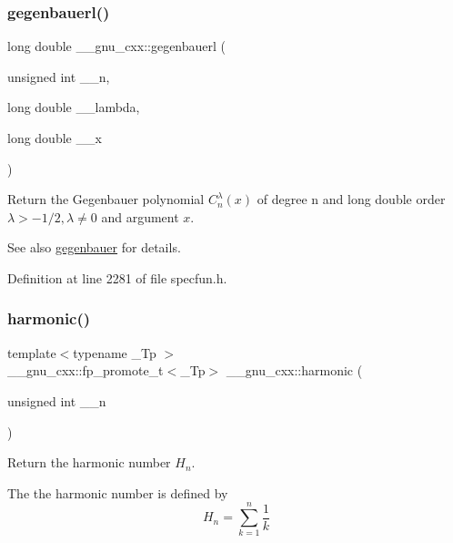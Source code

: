 \subsubsection{\texorpdfstring{gegenbauerl()}{gegenbauerl()}}
{\footnotesize\ttfamily long double \+\_\+\+\_\+gnu\+\_\+cxx\+::gegenbauerl (\begin{DoxyParamCaption}\item[{unsigned int}]{\+\_\+\+\_\+n,  }\item[{long double}]{\+\_\+\+\_\+lambda,  }\item[{long double}]{\+\_\+\+\_\+x }\end{DoxyParamCaption})\hspace{0.3cm}{\ttfamily [inline]}}

Return the Gegenbauer polynomial $ C_n^{\lambda}(x) $ of degree {\ttfamily n} and {\ttfamily long double} order $ \lambda > -1/2, \lambda \neq 0 $ and argument $ x $.

\begin{DoxySeeAlso}{See also}
\hyperlink{group__gnu__math__spec__func_ga512e7981e328d6184f604de1892048b6}{gegenbauer} for details. 
\end{DoxySeeAlso}


Definition at line 2281 of file specfun.\+h.

\mbox{\label{group__gnu__math__spec__func_gab052b72af9c7ec030bcea81965390614}} 
\subsubsection{\texorpdfstring{harmonic()}{harmonic()}}
{\footnotesize\ttfamily template$<$typename \+\_\+\+Tp $>$ \\
\+\_\+\+\_\+gnu\+\_\+cxx\+::fp\+\_\+promote\+\_\+t$<$\+\_\+\+Tp$>$ \+\_\+\+\_\+gnu\+\_\+cxx\+::harmonic (\begin{DoxyParamCaption}\item[{unsigned int}]{\+\_\+\+\_\+n }\end{DoxyParamCaption})\hspace{0.3cm}{\ttfamily [inline]}}

Return the harmonic number $ H_n $.

The the harmonic number is defined by \[ H_n = \sum_{k=1}^{n}\frac{1}{k} \]


